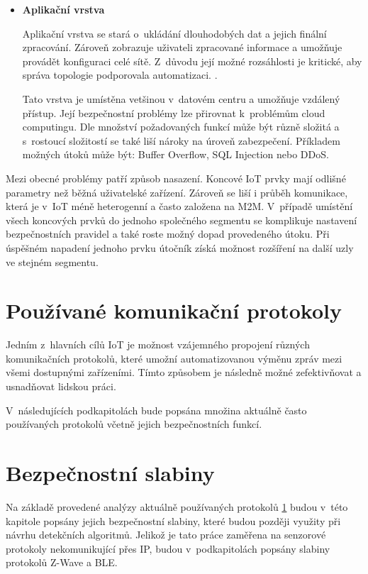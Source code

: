 \begin{itemize}
 \newpage
 \item \textbf{Aplikační vrstva}
 
 Aplikační vrstva se stará o~ukládání dlouhodobých dat a jejich finální zpracování. 
 Zároveň zobrazuje uživateli zpracované informace a umožňuje provádět konfiguraci
 celé sítě. Z~důvodu její možné rozsáhlosti je kritické, aby správa
 topologie podporovala automatizaci. \cite{secFramework}.
 
 Tato vrstva je umístěna vetšinou v~datovém centru a umožňuje vzdálený přístup. 
 Její bezpečnostní problémy lze přirovnat k~problémům cloud computingu. Dle
 množství požadovaných funkcí může být různě složitá a s~rostoucí složitostí
 se také liší nároky na úroveň zabezpečení. Příkladem možných útoků může být:
 Buffer Overflow, SQL Injection nebo DDoS.
 
\end{itemize}

Mezi obecné problémy patří způsob nasazení. Koncové IoT prvky mají odlišné parametry než 
běžná uživatelské zařízení. Zároveň se liší i průběh komunikace, která je v~IoT méně heterogenní
a často založena na M2M. V~případě umístění všech koncových prvků do jednoho společného segmentu
se komplikuje nastavení bezpečnostních pravidel a také roste možný dopad provedeného útoku. 
Při úspěšném napadení jednoho prvku útočník získá možnost rozšíření na další uzly ve stejném
segmentu.

 
 \newpage
 
 \section{Používané komunikační protokoly} \label{protokoly}
 Jedním z~hlavních cílů IoT je možnost vzájemného propojení různých komunikačních protokolů, 
 které umožní automatizovanou výměnu zpráv mezi všemi dostupnými zařízeními. Tímto způsobem
 je následně možné zefektivňovat a usnadňovat lidskou práci.
 
 V~následujících podkapitolách bude popsána množina aktuálně často používaných protokolů
 včetně jejich bezpečnostních funkcí.
 
  
   
   \newpage
  \section{Bezpečnostní slabiny}
  Na základě provedené analýzy aktuálně používaných protokolů \ref{protokoly} budou v~této kapitole 
  popsány jejich bezpečnostní slabiny, které budou později využity při návrhu 
  detekčních algoritmů. Jelikož je tato práce zaměřena na senzorové protokoly 
  nekomunikující přes IP, budou v~podkapitolách popsány slabiny protokolů 
  Z-Wave a BLE.
  
